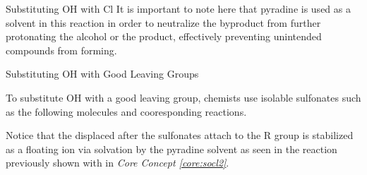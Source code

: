 \documentclass[10pt]{article}
\begin{document}
\begin{core}[label=core:socl2]{Substituting OH with Cl}
    It is important to note here that pyradine is used as a solvent in this reaction in order to neutralize the  byproduct from further protonating the alcohol or the product, effectively preventing unintended compounds from forming.


  \end{core}

  \begin{core}{Substituting OH with Good Leaving Groups}
   
    To substitute OH with a good leaving group, chemists use isolable sulfonates such as the following molecules and cooresponding reactions.


    Notice that the displaced  after the sulfonates attach to the R group is stabilized as a floating ion via solvation by the pyradine solvent as seen in the reaction previously shown with  in \textit{Core Concept \ref{core:socl2}}.

  \end{core}
\end{document}
